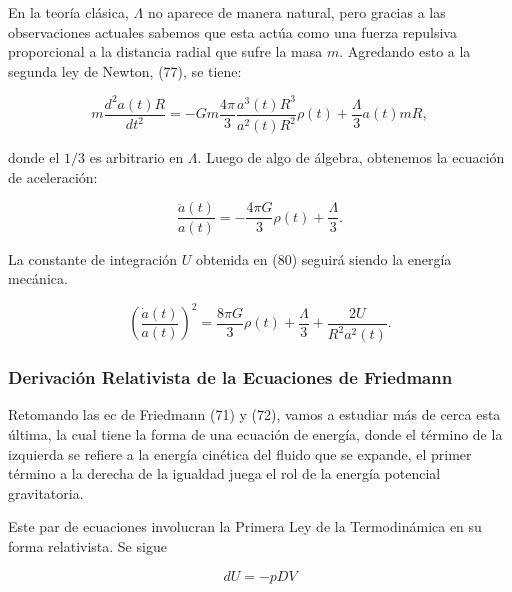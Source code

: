 \documentclass{article}
\begin{document}
    En la teoría clásica, $\Lambda$ no aparece de manera natural, pero gracias a las observaciones actuales sabemos que esta actúa como una fuerza repulsiva proporcional a la distancia radial que sufre la masa $m$. Agredando esto a la segunda ley de Newton, (77), se tiene: 
    
    \begin{equation}
        m \frac{d^2 a(t)R}{dt^2} = -Gm \frac{4\pi}{3}\frac{a^3(t)R^3}{a^2(t)R^2}\rho(t) + \frac{\Lambda}{3} a(t) mR,
    \end{equation}
    
    donde el $1/3$ es arbitrario en $\Lambda$. Luego de algo de álgebra, obtenemos la ecuación de aceleración: 
    
    \begin{equation}
        \boxed{\frac{\ddot{a}(t)}{a(t)} = - \frac{4\pi G}{3}  \rho(t) + \frac{\Lambda}{3}.} 
    \end{equation}
    
    La constante de integración $U$ obtenida en (80) seguirá siendo la energía mecánica. 
    
    \begin{equation}
        \boxed{\left(\frac{\dot{a}(t)}{a(t)} \right)^2 = \frac{8\pi G}{3} \rho(t) + \frac{\Lambda}{3} +  \frac{2U}{R^2 a^2(t)}.}
    \end{equation}
    
    \subsubsection{Derivación Relativista de la Ecuaciones de Friedmann}
    
    Retomando las ec de Friedmann (71) y (72), vamos a estudiar más de cerca esta última, la cual tiene la forma de una ecuación de energía, donde el término de la izquierda se refiere a la energía cinética del fluido que se expande, el primer término a la derecha de la igualdad juega el rol de la energía potencial gravitatoria.
    
    
    Este par de ecuaciones involucran la Primera Ley de la Termodinámica en su forma relativista. Se sigue
    
    \begin{equation}
        dU = -p DV
    \end{equation}
    
    
    
\end{document}
